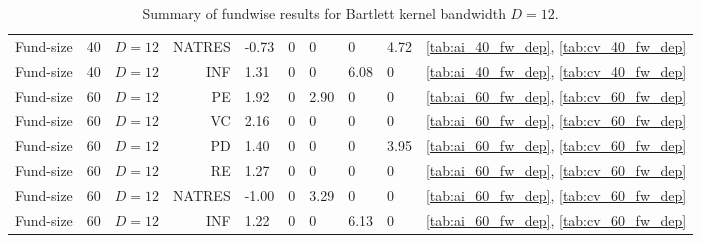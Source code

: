 \documentclass[12pt]{article}
\begin{document}
\begin{table}[ht]
\begin{tabular}{lllrlllllr}
		Fund-size & 40 & $D=12$ & NATRES & -0.73 & 0 & 0 & 0 & 4.72 & \ref{tab:ai_40_fw_dep}, \ref{tab:cv_40_fw_dep} \\ 
		Fund-size & 40 & $D=12$ & INF & 1.31 & 0 & 0 & 6.08 & 0 & \ref{tab:ai_40_fw_dep}, \ref{tab:cv_40_fw_dep} \\ 
		\hline
		Fund-size & 60 & $D=12$ & PE & 1.92 & 0 & 2.90 & 0 & 0 & \ref{tab:ai_60_fw_dep}, \ref{tab:cv_60_fw_dep} \\ 
		Fund-size & 60 & $D=12$ & VC & 2.16 & 0 & 0 & 0 & 0 & \ref{tab:ai_60_fw_dep}, \ref{tab:cv_60_fw_dep} \\ 
		Fund-size & 60 & $D=12$ & PD & 1.40 & 0 & 0 & 0 & 3.95 & \ref{tab:ai_60_fw_dep}, \ref{tab:cv_60_fw_dep} \\ 
		Fund-size & 60 & $D=12$ & RE & 1.27 & 0 & 0 & 0 & 0 & \ref{tab:ai_60_fw_dep}, \ref{tab:cv_60_fw_dep} \\ 
		Fund-size & 60 & $D=12$ & NATRES & -1.00 & 0 & 3.29 & 0 & 0 & \ref{tab:ai_60_fw_dep}, \ref{tab:cv_60_fw_dep} \\ 
		Fund-size & 60 & $D=12$ & INF & 1.22 & 0 & 0 & 6.13 & 0 & \ref{tab:ai_60_fw_dep}, \ref{tab:cv_60_fw_dep} \\ 
		\hline
		\hline
	\end{tabular}
	\caption{Summary of fundwise results for Bartlett kernel bandwidth $D=12$.}
	\label{tab:result_summary}
\end{table}
\end{document}
